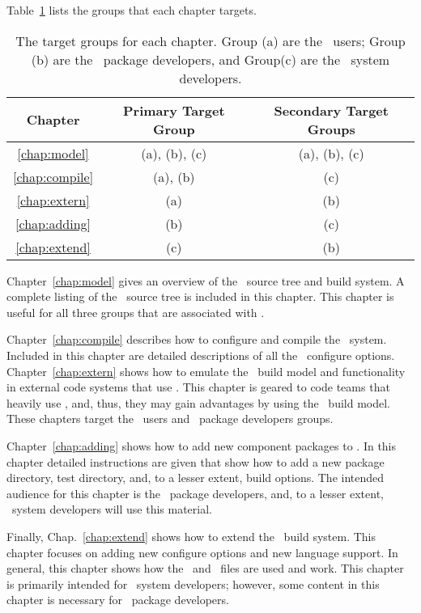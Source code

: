 Table~\ref{tab:layout} lists the groups that each chapter targets.
\begin{table}
  \begin{center}
    \caption{The target groups for each chapter.  Group (a) are the
      \draco\ users; Group (b) are the \draco\ package developers, and 
      Group(c) are the \draco\ system developers.}
    \label{tab:layout}
    \begin{tabular}{ccc}\hline\hline
      Chapter & Primary Target Group & Secondary Target Groups
      \\ \hline 
      \ref{chap:model} & (a), (b), (c) & (a), (b), (c) \\ 
      \ref{chap:compile} & (a), (b) & (c) \\ 
      \ref{chap:extern} & (a) & (b) \\
      \ref{chap:adding} & (b) & (c) \\ 
      \ref{chap:extend} & (c) & (b) \\ \hline \hline
    \end{tabular}
  \end{center}
\end{table}
Chapter~\ref{chap:model} gives an overview of the \draco\ source tree
and build system. A complete listing of the \draco\ source tree is
included in this chapter. This chapter is useful for all three groups
that are associated with \draco.

Chapter~\ref{chap:compile} describes how to configure and compile the
\draco\ system.  Included in this chapter are detailed descriptions of
all the \draco\ configure options. Chapter~\ref{chap:extern} shows how
to emulate the \draco\ build model and functionality in external code
systems that use \draco.  This chapter is geared to code teams that
heavily use \draco, and, thus, they may gain advantages by using the
\draco\ build model. These chapters target the \draco\ users and
\draco\ package developers groups.

Chapter~\ref{chap:adding} shows how to add new component packages to
\draco.  In this chapter detailed instructions are given that show how
to add a new package directory, test directory, and, to a lesser
extent, build options.  The intended audience for this chapter is the
\draco\ package developers, and, to a lesser extent, \draco\ system
developers will use this material.

Finally, Chap.~\ref{chap:extend} shows how to extend the \draco\ build 
system.  This chapter focuses on adding new configure options and new
language support.  In general, this chapter shows how the \gmake\ and
\autoconf\ files are used and work.  This chapter is primarily intended
for \draco\ system developers; however, some content in this chapter
is necessary for \draco\ package developers.

